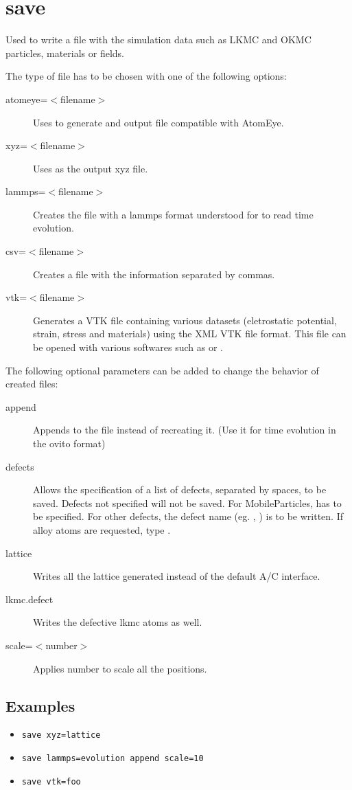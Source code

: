 \section{save}
\label{sec:save}

Used to write a file with the simulation data such as LKMC and OKMC particles, materials or fields.

The type of file has to be chosen with one of the following options:

\begin{description}
\item [atomeye=$<$filename$>$] Uses  to generate and output file compatible with AtomEye.
\item [xyz=$<$filename$>$] Uses  as the output xyz file.
\item [lammps=$<$filename$>$] Creates the file with a lammps format understood for  to read time evolution.
\item [csv=$<$filename$>$] Creates a file with the information separated by commas.
\item [vtk=$<$filename$>$] Generates a VTK file containing various datasets (eletrostatic potential, strain, stress and materials) using the XML VTK file format. This file can be opened with various softwares such as  or .
\end{description}

The following optional parameters can be added to change the behavior of created files:

\begin{description}
\item [append] Appends to the file instead of recreating it. (Use it for time evolution in the ovito format)
\item [defects] Allows the specification of a list of defects, separated by spaces, to be saved. Defects not specified will not be saved. For MobileParticles,  has to be specified. For other defects, the defect name (eg. , ) is to be written. If alloy atoms are requested, type .
\item [lattice] Writes all the lattice generated instead of the default A/C interface.
\item [lkmc.defect] Writes the defective lkmc atoms as well.
\item [scale=$<$number$>$] Applies number to scale all the positions.
\end{description}

\subsection{Examples}\begin{itemize}
\item \verb+save xyz=lattice+
\item \verb+save lammps=evolution append scale=10+
\item \verb+save vtk=foo+
\end{itemize}

